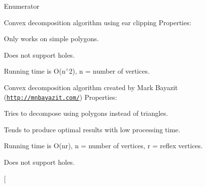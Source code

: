 \begin{Desc}
\item[Enumerator]\par
\begin{description}
\item[{\em 
\hypertarget{namespace_farseer_physics_1_1_common_1_1_decomposition_aaf4a6ce83f6797b197ff74a08b9f4575a67ac673518d5cac732e925c3621006fd}{Earclip}\label{namespace_farseer_physics_1_1_common_1_1_decomposition_aaf4a6ce83f6797b197ff74a08b9f4575a67ac673518d5cac732e925c3621006fd}
}]Convex decomposition algorithm using ear clipping Properties\+:
\begin{DoxyItemize}
\item Only works on simple polygons.
\item Does not support holes.
\item Running time is O(n$^\wedge$2), n = number of vertices. 
\end{DoxyItemize}\item[{\em 
\hypertarget{namespace_farseer_physics_1_1_common_1_1_decomposition_aaf4a6ce83f6797b197ff74a08b9f4575a666e685ea058b7188395cd99aa1b8a19}{Bayazit}\label{namespace_farseer_physics_1_1_common_1_1_decomposition_aaf4a6ce83f6797b197ff74a08b9f4575a666e685ea058b7188395cd99aa1b8a19}
}]Convex decomposition algorithm created by Mark Bayazit (\href{http://mnbayazit.com/}{\tt http\+://mnbayazit.\+com/}) Properties\+:
\begin{DoxyItemize}
\item Tries to decompose using polygons instead of triangles.
\item Tends to produce optimal results with low processing time.
\item Running time is O(nr), n = number of vertices, r = reflex vertices.
\item Does not support holes. 
\end{DoxyItemize}\item[{\em 
}
\end{description}
\end{Desc}
